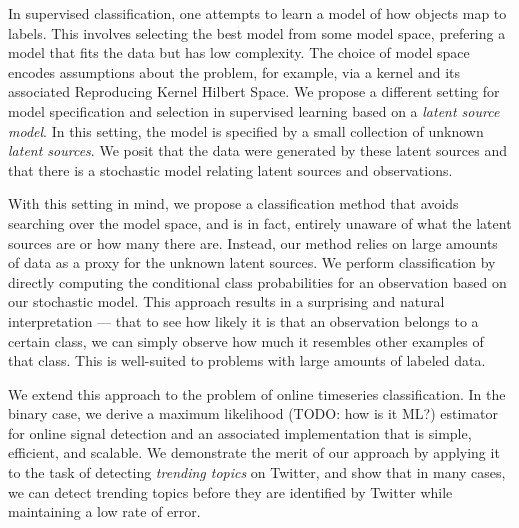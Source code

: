 
In supervised classification, one attempts to learn a model of how objects map
to labels. This involves selecting the best model from some model space,
prefering a model that fits the data but has low complexity. The choice of model
space encodes assumptions about the problem, for example, via a kernel and its
associated Reproducing Kernel Hilbert Space. We propose a different setting for
model specification and selection in supervised learning based on a {\em latent
  source model}. In this setting, the model is specified by a small collection
of unknown {\em latent sources}. We posit that the data were generated by these
latent sources and that there is a stochastic model relating latent sources and
observations.

With this setting in mind, we propose a classification method that avoids
searching over the model space, and is in fact, entirely unaware of what the
latent sources are or how many there are. Instead, our method relies on large
amounts of data as a proxy for the unknown latent sources. We perform
classification by directly computing the conditional class probabilities for an
observation based on our stochastic model. This approach results in a surprising
and natural interpretation --- that to see how likely it is that an observation
belongs to a certain class, we can simply observe how much it resembles other
examples of that class. This is well-suited to problems with large amounts of
labeled data.

We extend this approach to the problem of online timeseries classification. In
the binary case, we derive a maximum likelihood (TODO: how is it ML?) estimator
for online signal detection and an associated implementation that is simple,
efficient, and scalable. We demonstrate the merit of our approach by applying it
to the task of detecting {\em trending topics} on Twitter, and show that in many
cases, we can detect trending topics before they are identified by Twitter while
maintaining a low rate of error.


